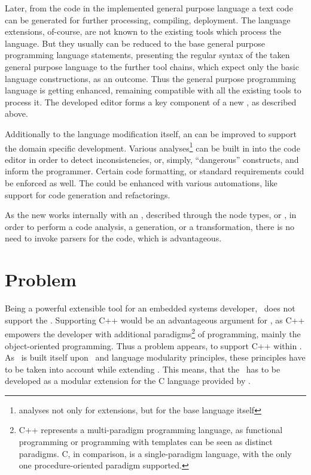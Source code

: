 Later, from the code in the implemented general purpose language a text code can be generated for further processing, 
compiling, deployment. The language extensions, of-course, are not known to the existing tools which process the language.
But they usually can be reduced to the base general purpose programming language statements, presenting the regular 
syntax of the taken general purpose language to the further tool chains, which expect only the basic language constructions, 
as an outcome.  Thus the general purpose programming language is getting enhanced, remaining compatible with all the 
existing tools to process it. The developed editor forms a key component of a new , as described above.

Additionally to the language modification itself, an  can be improved to support the domain specific 
development. Various analyses\footnote{analyses not only for extensions, but for the base language itself} 
can be built in into the code editor in order to detect inconsistencies, or, simply, ``dangerous'' constructs, 
and inform the programmer. Certain code formatting, or standard requirements could be enforced as well. 
The  could be enhanced with various automations, like support for code generation and refactorings. 

As the new  works internally with an , described through the node types, or , in order to perform a code
analysis, a generation, or a transformation, there is no need to invoke parsers for the code, which is advantageous.

\section{Problem}

Being a powerful extensible tool for an embedded systems developer, \mbdr\ does not support the \cpppl. Supporting C++ would be an
advantageous argument for \mbdr, as C++ empowers the developer with additional paradigms\footnote{C++ represents 
a multi-paradigm programming language, as functional programming or programming with templates can be seen as 
distinct paradigms. C, in comparison, is a single-paradigm language, with the only one procedure-oriented paradigm supported.}
of programming, mainly the object-oriented programming. Thus a problem appears, to support C++ within \mbdr. As \mbdr\ is built itself  upon
\jbmps\ and language modularity principles, these principles have to be taken into account while extending \mbdr.
This means, that the \cpppl\ has to be developed as a modular extension for the C language provided by \mbdr.


